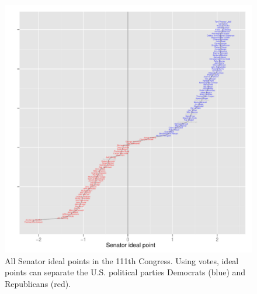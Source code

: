 \begin{figure}[t]
  \includegraphics[width=1.\textwidth]
  {chapter_spatial_voting_with_text/figures/134_senator_name_accuracy_by_ip.pdf}
  \caption{All Senator ideal points in the 111th Congress.  Using
    votes, ideal points can separate the U.S. political parties
    Democrats (blue) and Republicans (red).}
\label{fig:senate_ideal_points}
\end{figure}






